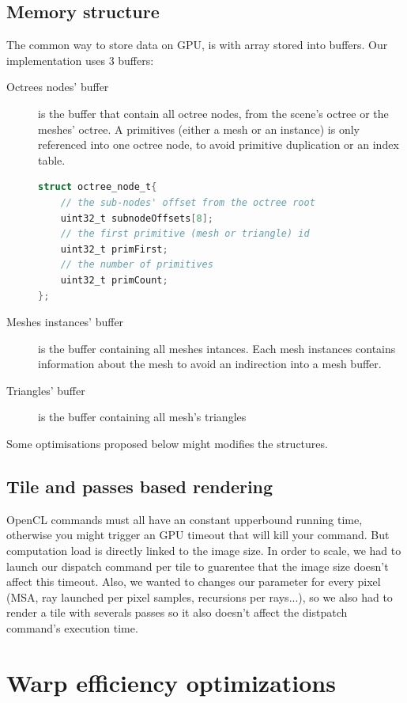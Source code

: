 \documentclass[10pt,twocolumn,a4paper]{article}
\begin{document}
\subsection{Memory structure}
The common way to store data on GPU, is with array stored into buffers.
Our implementation uses 3 buffers:
\begin{description}
    \item[Octrees nodes' buffer] is the buffer that contain all octree nodes,
        from the scene's octree or the meshes' octree. A primitives (either a
        mesh or an instance) is only referenced into one octree node, to avoid
        primitive duplication or an index table.
        \begin{lstlisting}[frame=single,language=C,breaklines=true,basicstyle=\tiny]
struct octree_node_t{
    // the sub-nodes' offset from the octree root
    uint32_t subnodeOffsets[8];
    // the first primitive (mesh or triangle) id
    uint32_t primFirst;
    // the number of primitives
    uint32_t primCount;
};
        \end{lstlisting}
    \item[Meshes instances' buffer] is the buffer containing all meshes intances.
        Each mesh instances contains information about the mesh to avoid an
        indirection into a mesh buffer.
    \item[Triangles' buffer] is the buffer containing all mesh's triangles
\end{description}
Some optimisations proposed below might modifies the structures.

\subsection{Tile and passes based rendering}
OpenCL commands must all have an constant upperbound running time, otherwise
you might trigger an GPU timeout that will kill your command. But computation
load is directly linked to the image size. In order to scale, we had to launch
our dispatch command per tile to guarentee that the image size doesn't affect
this timeout. Also, we wanted to changes our parameter for every pixel (MSA,
ray launched per pixel samples, recursions per rays...), so we also had to
render a tile with severals passes so it also doesn't affect the distpatch
command's execution time.

\section{Warp efficiency optimizations}
\end{document}
